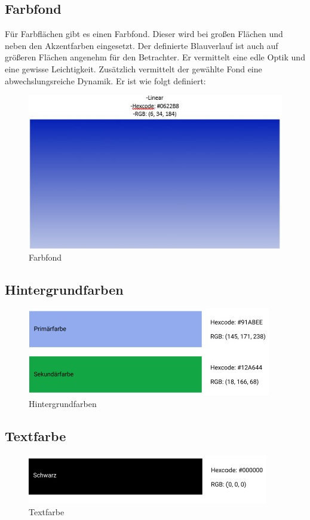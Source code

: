 \documentclass[11pt,
paper=a4,
bibtotocnumbered,	  %
liststotocnumbered,  %
DIV=calc,		  %
tablecaptionabove,	  %
headinclude,
]{article}
\begin{document}
\subsection{Farbfond}
Für Farbflächen gibt es einen Farbfond. Dieser wird bei großen Flächen und neben den Akzentfarben eingesetzt. Der definierte Blauverlauf ist auch auf größeren Flächen angenehm für den Betrachter. Er vermittelt eine edle Optik und eine gewisse Leichtigkeit. Zusätzlich vermittelt der gewählte Fond eine abwechslungsreiche Dynamik. Er ist wie folgt definiert: 
\begin{figure}[H]
\includegraphics[scale=1]{Bilder/farbfont.jpg}
\caption{Farbfond}
\end{figure}
\subsection{Hintergrundfarben}
\begin{figure}[H]
\includegraphics[scale=1]{Bilder/Hintergrundfarben.jpg}
\caption{Hintergrundfarben}
\end{figure}
\subsection{Textfarbe}
\begin{figure}[H]
\includegraphics[scale=1]{Bilder/Textfarben.jpg}
\caption{Textfarbe}
\end{figure}
\end{document}
